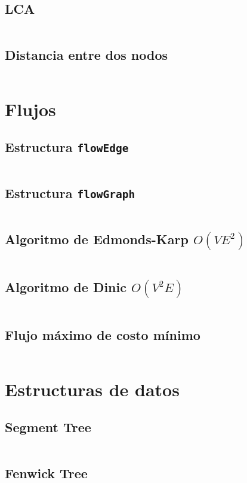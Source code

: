 \documentclass[11pt]{article}
\begin{document}
		\subsection{LCA}
		\inputminted[tabsize=2,breaklines,firstline=536,lastline=555,fontsize=\small]{c++}{graph.cpp}
		
		\subsection{Distancia entre dos nodos}
		\inputminted[tabsize=2,breaklines,firstline=557,lastline=580,fontsize=\small]{c++}{graph.cpp}
		
	\newpage
	\section{Flujos}
		\subsection{Estructura \texttt{flowEdge}}
		\inputminted[tabsize=2,breaklines,firstline=4,lastline=21,fontsize=\small]{c++}{flow.cpp}
		
		\subsection{Estructura \texttt{flowGraph}}
		\inputminted[tabsize=2,breaklines,firstline=23,lastline=47,fontsize=\small]{c++}{flow.cpp}
		
		\subsection{Algoritmo de Edmonds-Karp $O(VE^2)$}
		\inputminted[tabsize=2,breaklines,firstline=91,lastline=117,fontsize=\small]{c++}{flow.cpp}
		
		\subsection{Algoritmo de Dinic $O(V^2E)$}
		\inputminted[tabsize=2,breaklines,firstline=49,lastline=89,fontsize=\small]{c++}{flow.cpp}
		
		\subsection{Flujo máximo de costo mínimo}
		\inputminted[tabsize=2,breaklines,firstline=119,lastline=154,fontsize=\small]{c++}{flow.cpp}
		
	\newpage
	\section{Estructuras de datos}
		\subsection{Segment Tree}
		\inputminted[tabsize=2,breaklines,firstline=4,lastline=50,fontsize=\small]{c++}{queries.cpp}
		
		\subsection{Fenwick Tree}
		\inputminted[tabsize=2,breaklines,firstline=52,lastline=90,fontsize=\small]{c++}{queries.cpp}
\end{document}
